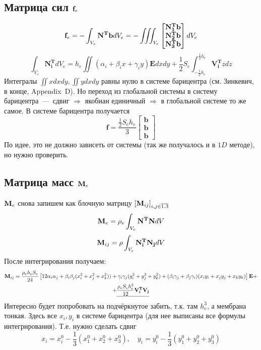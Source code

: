 \documentclass[12pt,a4paper,fleqn]{article}
\begin{document}
	\subsection{Матрица сил $\mathbf{f}_e$}
		\begin{equation}
			\mathbf{f}_e = - \int_{V_e} \mathbf{N^Tb}dV_e 
					= - \iiint_{V_e} \begin{bmatrix}
								\mathbf{N_1^T}\mathbf{b} \\
								\mathbf{N_2^T}\mathbf{b} \\
								\mathbf{N_3^T}\mathbf{b}
							\end{bmatrix} dV_e
		\end{equation}
		\begin{equation}
			\int_{V_e}\mathbf{N_i^T}dV_e = 
				h_e\iint(\alpha_i + \beta_i x + \gamma_i y)\mathbf{E}dx dy +
				\frac12 S_e \int_{-\frac12 h_e}^{\frac12 h_e}\mathbf{V_i^T}z dz
		\end{equation}
		Интегралы $\iint x dxdy, \iint y dxdy$ равны нулю в системе барицентра (см. Зинкевич, в конце, Appendix~D). 
			Но переход из глобальной системы в систему барицентра~---~сдвиг $\Rightarrow$ якобиан единичный $\Rightarrow$ в глобальной системе то же самое.
			В системе барицентра получается 
		\begin{equation}
			\mathbf{f} = \frac{\frac12 S_e h_e}{3}
					\begin{bmatrix} \mathbf{b} \\ \mathbf{b} \\ \mathbf{b}  \end{bmatrix}
		\end{equation}
		По идее, это не  должно зависеть от системы (так же получалось и в $1D$ методе), но нужно проверить.
	\subsection{Матрица масс $\mathbf{M}_e$}
		$\mathbf{M}_e$ снова запишем как блочную матрицу $\left[  \mathbf{M}_{ij}  \right]_{i,j \in \overline{1,3}}$
		\begin{equation}
			\mathbf{M}_e = \rho_e\int_{V_e}{\mathbf{N^TN}}dV
		\end{equation}
		\begin{equation}
			\mathbf{M}_{ij} = \rho\int_{V_e}\mathbf{N_i^TN_j}dV 
		\end{equation}
		После интегрирования получаем:
		\begin{multline}
			\mathbf{M}_{ij} = \frac{\rho_e h_e S_e}{24} \left[ 12\alpha_i \alpha_j 
								+ \beta_i \beta_j(x_i^2 + x_j^2 + x_k^2))
								+ \gamma_i \gamma_j(y_i^2 + y_j^2 + y_k^2)
								+(\beta_i\gamma_j + \beta_j\gamma_i)(x_iy_i + x_jy_j + x_ky_k)\right] \mathbf{E} + \\
								+ \underline{\frac{\rho_e S_e h_e^3}{12} \mathbf{V_i^TV_j}}
		\end{multline}
		Интересно будет попробовать на подчёркнутое забить, т.к. там $h_e^3$, а мембрана тонкая.
		Здесь все $x_i, y_i$ в системе барицентра (для нее выписаны все формулы интегрирования). Т.е. нужно сделать сдвиг
		$$
			x_i = x^0_i - \frac13(x^0_1 + x^0_2 + x^0_3), \quad  y_i = y^0_i - \frac13(y^0_1 + y^0_2 + y^0_3)
		$$
		
\end{document}
